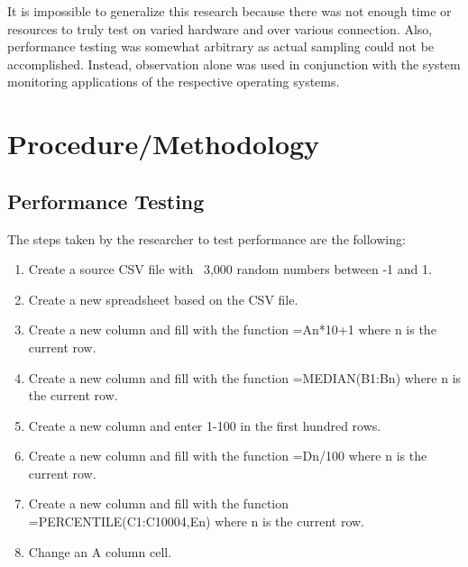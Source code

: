 







It is impossible to generalize this research because there was not enough time
or resources to truly test on varied hardware and over various connection.
Also, performance testing was somewhat arbitrary as actual sampling could not be
accomplished.  Instead, observation alone was used in conjunction with the
system monitoring applications of the respective operating systems.

\section{Procedure/Methodology}

\subsection{Performance Testing}


The steps taken by the researcher to test performance are the following:

\begin{enumerate}

\item Create a source CSV file with ~3,000 random numbers between -1 and 1.

\item Create a new spreadsheet based on the CSV file.

\item Create a new column and fill with the function =An*10+1 where n is the
  current row.

\item Create a new column and fill with the function =MEDIAN(B1:Bn) where n is
  the current row.

\item Create a new column and enter 1-100 in the first hundred rows.

\item Create a new column and fill with the function =Dn/100 where n is the
  current row.

\item Create a new column and fill with the function =PERCENTILE(C1:C10004,En)
  where n is the current row.

\item Change an A column cell.

\end{enumerate}

